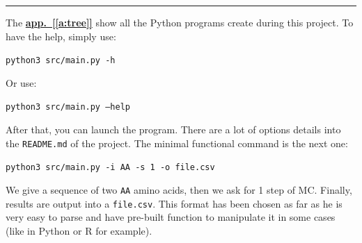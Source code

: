 \documentclass[12pt, oneside, a4paper]{report}
\newcommand{\aref}[1]{\hyperref[#1]{\textbf{app.~[\ref*{#1}]}}}
\begin{document}
    \small
    \vspace{0.5ex}
    \hrule height 1pt

\endgroup

The \aref{a:tree} show all the Python programs create during this project. To have the help, simply use:

\texttt{python3 src/main.py -h}

Or use:

\texttt{python3 src/main.py --help}

After that, you can launch the program. There are a lot of options details into the \texttt{README.md} of the project. The minimal functional command is the next one:

\texttt{python3 src/main.py -i AA -s 1 -o file.csv}

We give a sequence of two \texttt{AA} amino acids, then we ask for 1 step of MC. Finally, results are output into a \texttt{file.csv}. This format has been chosen as far as he is very easy to parse and have pre-built function to manipulate it in some cases (like in Python or R for example).
\end{document}
